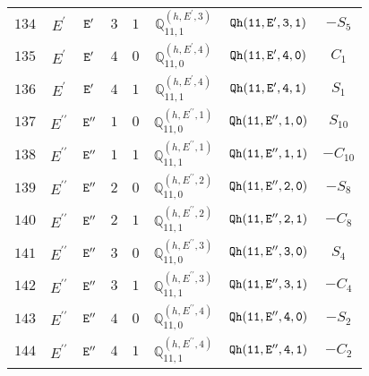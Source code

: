 \documentclass[fleqn,8pt]{jsarticle}
\begin{document}
\begin{table}[ht!]
\begin{center}
\begin{tabular}{cccccccc}
$ 134 $ & $ E^{\prime} $ & $ {\tt E'} $ & $ 3 $ & $ 1 $ & $ \mathbb{Q}_{11,1}^{(h,E^{\prime},3)} $ & $ {\tt Qh(11,E',3,1)} $ & $ - S_{5} $ \\
$ 135 $ & $ E^{\prime} $ & $ {\tt E'} $ & $ 4 $ & $ 0 $ & $ \mathbb{Q}_{11,0}^{(h,E^{\prime},4)} $ & $ {\tt Qh(11,E',4,0)} $ & $ C_{1} $ \\
$ 136 $ & $ E^{\prime} $ & $ {\tt E'} $ & $ 4 $ & $ 1 $ & $ \mathbb{Q}_{11,1}^{(h,E^{\prime},4)} $ & $ {\tt Qh(11,E',4,1)} $ & $ S_{1} $ \\
$ 137 $ & $ E^{\prime\prime} $ & $ {\tt E''} $ & $ 1 $ & $ 0 $ & $ \mathbb{Q}_{11,0}^{(h,E^{\prime\prime},1)} $ & $ {\tt Qh(11,E'',1,0)} $ & $ S_{10} $ \\
$ 138 $ & $ E^{\prime\prime} $ & $ {\tt E''} $ & $ 1 $ & $ 1 $ & $ \mathbb{Q}_{11,1}^{(h,E^{\prime\prime},1)} $ & $ {\tt Qh(11,E'',1,1)} $ & $ - C_{10} $ \\
$ 139 $ & $ E^{\prime\prime} $ & $ {\tt E''} $ & $ 2 $ & $ 0 $ & $ \mathbb{Q}_{11,0}^{(h,E^{\prime\prime},2)} $ & $ {\tt Qh(11,E'',2,0)} $ & $ - S_{8} $ \\
$ 140 $ & $ E^{\prime\prime} $ & $ {\tt E''} $ & $ 2 $ & $ 1 $ & $ \mathbb{Q}_{11,1}^{(h,E^{\prime\prime},2)} $ & $ {\tt Qh(11,E'',2,1)} $ & $ - C_{8} $ \\
$ 141 $ & $ E^{\prime\prime} $ & $ {\tt E''} $ & $ 3 $ & $ 0 $ & $ \mathbb{Q}_{11,0}^{(h,E^{\prime\prime},3)} $ & $ {\tt Qh(11,E'',3,0)} $ & $ S_{4} $ \\
$ 142 $ & $ E^{\prime\prime} $ & $ {\tt E''} $ & $ 3 $ & $ 1 $ & $ \mathbb{Q}_{11,1}^{(h,E^{\prime\prime},3)} $ & $ {\tt Qh(11,E'',3,1)} $ & $ - C_{4} $ \\
$ 143 $ & $ E^{\prime\prime} $ & $ {\tt E''} $ & $ 4 $ & $ 0 $ & $ \mathbb{Q}_{11,0}^{(h,E^{\prime\prime},4)} $ & $ {\tt Qh(11,E'',4,0)} $ & $ - S_{2} $ \\
$ 144 $ & $ E^{\prime\prime} $ & $ {\tt E''} $ & $ 4 $ & $ 1 $ & $ \mathbb{Q}_{11,1}^{(h,E^{\prime\prime},4)} $ & $ {\tt Qh(11,E'',4,1)} $ & $ - C_{2} $ \\
 \hline \hline
\end{tabular}
\end{center}
\end{table}
\end{document}
